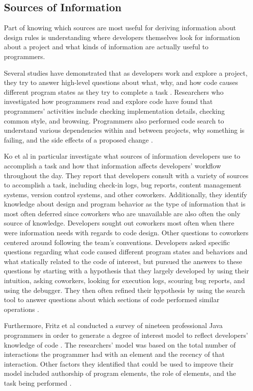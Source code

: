 \documentclass[12pt]{article}
\begin{document}
\subsection{Sources of Information} \label{infoSrcs}

	Part of knowing which sources are most useful for deriving information about design rules is understanding where developers themselves look for information about a project and what kinds of information are actually useful to programmers.  

Several studies have demonstrated that as developers work and explore a project, they try to answer high-level questions about what, why, and how code causes different program states as they try to complete a task \cite{SadowskiEtAl2015, LaTozaMyers2010, LaTozaEtAl2007}. Researchers who investigated how programmers read and explore code have found that programmers' activities include checking implementation details, checking common style, and browsing. Programmers also performed code search to understand various dependencies within and between projects, why something is failing, and the side effects of a proposed change \cite{SadowskiEtAl2015}. 

Ko et al in particular investigate what sources of information developers use to accomplish a task and how that information affects developers' workflow throughout the day. They report that developers consult with a variety of sources to accomplish a task, including check-in logs, bug reports, content management systems, version control systems, and other coworkers. Additionally, they identify knowledge about design and program behavior as the type of information that is most often deferred since coworkers who are unavailable are also often the only source of knowledge. Developers sought out coworkers most often when there were information needs with regards to code design. Other questions to coworkers centered around following the team's conventions. Developers asked specific questions regarding what code caused different program states and behaviors and what statically related to the code of interest, but pursued the answers to these questions by starting with a hypothesis that they largely developed by using their intuition, asking coworkers, looking for execution logs, scouring bug reports, and using the debugger. They then often refined their hypothesis by using the search tool to answer questions about which sections of code performed similar operations \cite{KoEtAl2007}. 

Furthermore, Fritz et al conducted a survey of nineteen professional Java programmers in order to generate a degree of interest model to reflect developers' knowledge of code \cite{FritzEtAl2007}. The researchers' model was based on the total number of interactions the programmer had with an element and the recency of that interaction. Other factors they identified that could be used to improve their model included authorship of program elements, the role of elements, and the task being performed \cite{FritzEtAl2007}.
\end{document}
